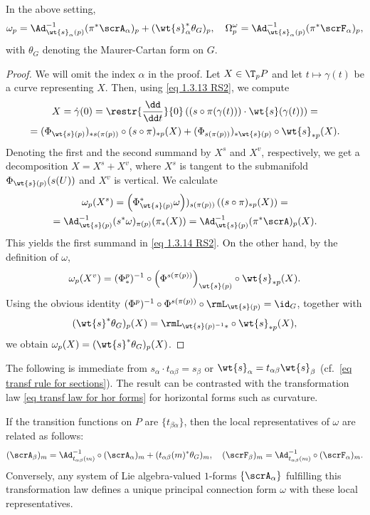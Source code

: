 \begin{prop}[{{\cite[Prop.~1.3.11]{RS2}}}]
    In the above setting, 
    \[\omega_p=\Ad_{\wt{s}_\alpha(p)}^{-1}(\pi^\ast\scrA_\alpha)_p+(\wt{s}_\alpha^\ast \theta_G)_p,\quad \Omega^\omega_p=\Ad_{\wt{s}_\alpha(p)}^{-1}(\pi^\ast \scrF_\alpha)_p, \label{eq 1.3.14 RS2}\]
    with $\theta_G$ denoting the Maurer-Cartan form on $G$.
\end{prop}
\begin{proof}
    We will omit the index $\alpha$ in the proof. Let $X\in \T_pP$ and let $t\mapsto \gamma(t)$ be a curve representing $X$. Then, using \eqref{eq 1.3.13 RS2}, we compute
    \begin{multline}
        X=\dot\gamma(0)=\restr{\frac{\dd}{\dd t}}{0} \left((s\circ \pi(\gamma(t)))\cdot \wt{s}(\gamma(t))\right)=\\
        =(\Phi_{\wt{s}(p)})_{\ast s(\pi(p))}\circ (s\circ \pi)_{\ast p}(X)+(\Phi_{s(\pi(p))})_{\ast\wt{s}(p)}\circ \wt{s}_{\ast p}(X).
    \end{multline}
    Denoting the first and the second summand by $X^s$ and $X^v$, respectively, we get a decomposition $X=X^s+X^v$, where $X^s$ is tangent to the submanifold $\Phi_{\wt{s}(p)}(s(U))$ and $X^v$ is vertical. We calculate
    \begin{multline}
        \omega_p(X^s)=\left(\Phi_{\wt{s}(p)}^\ast\omega\right))_{s(\pi(p))}\left((s\circ\pi)_{\ast p}(X)\right)=\\
        =\Ad_{\wt{s}(p)}^{-1}(s^\ast \omega)_{\pi(p)}(\pi_\ast(X))=\Ad_{\wt{s}(p)}^{-1}(\pi^\ast\scrA)_p(X).
    \end{multline}
    This yields the first summand in \eqref{eq 1.3.14 RS2}. On the other hand, by the definition of $\omega$, 
    \[\omega_p(X^v)=(\Phi^p_{\ast})^{-1}\circ \left(\Phi^{s(\pi(p))}\right)_{\wt{s}(p)}\circ \wt{s}_{\ast p}(X).\]
    Using the obvious identity $(\Phi^p)^{-1}\circ \Phi^{s(\pi(p))}\circ \rmL_{\wt{s}(p)}=\id_G$, together with
    \[(\wt{s}^\ast \theta_G)_p(X)=\rmL_{\wt{s}(p)^{-1}\ast }\circ\wt{s}_{\ast p}(X),\]
    we obtain $\omega_p(X)=(\wt{s}^\ast\theta_G)_p(X)$.
\end{proof}
The following is immediate from $s_\alpha\cdot t_{\alpha\beta}=s_\beta$  or $\wt{s}_\alpha=t_{\alpha\beta}\wt{s}_\beta$ (cf.\ \eqref{eq transf rule for sections}). The result can be contrasted with the transformation law \eqref{eq transf law for hor forms} for horizontal forms such as curvature.
\begin{cor}[{{\cite[Cor.~1.3.12]{RS2}}}]\label{cor 1.3.12 RS2}
    If the transition functions on $P$ are $\{t_{\beta\alpha}\}$, then the local representatives of $\omega$ are related as follows:
    \[(\scrA_\beta)_m=\Ad_{t_{\alpha\beta}(m)}^{-1}\circ (\scrA_\alpha)_m+(t_{\alpha\beta}(m)^\ast\theta_G)_m,\quad (\scrF_\beta)_m=\Ad_{t_{\alpha\beta}(m)}^{-1}\circ (\scrF_\alpha)_m.\label{eq 1.3.15 RS2}\]
    Conversely, any system of Lie algebra-valued $1$-forms $\{\scrA_\alpha\}$ fulfilling this transformation law defines a unique principal connection form $\omega$ with these local representatives.
\end{cor}

